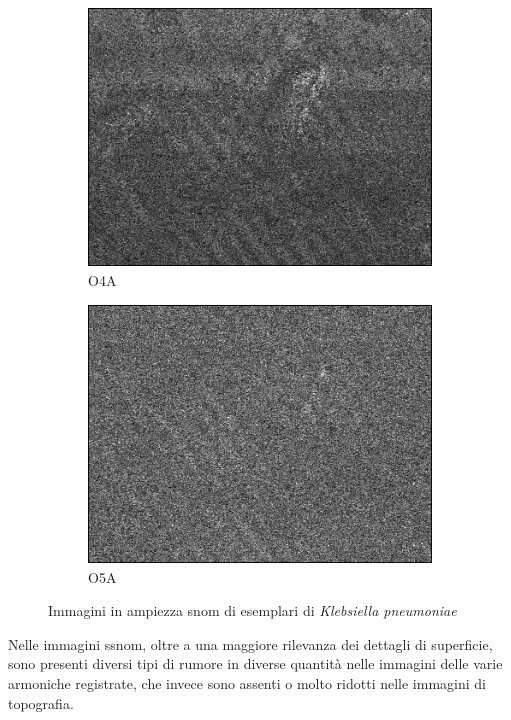 \documentclass[../main.tex]{subfiles}
\begin{document}
\begin{figure}[ht]
\begin{subfigure}{0.32\linewidth}
		\includegraphics[keepaspectratio, width=\linewidth]{images/kp_o4a.png}
		\caption{O4A}
	\end{subfigure}
	\begin{subfigure}{0.32\linewidth}
		\centering
		\includegraphics[keepaspectratio, width=\linewidth]{images/kp_o5a.png}
		\caption{O5A}
	\end{subfigure}
	\caption[Immagini in ampiezza SNOM di esemplari di \textit{Klebsiella pneumoniae}]{
		Immagini in ampiezza \acrshort{snom} di esemplari di \textit{Klebsiella pneumoniae} \cite{ssnombacter_data}}
\end{figure}

Nelle immagini \acrshort{ssnom}, oltre a una maggiore rilevanza dei dettagli di superficie, sono presenti diversi tipi di rumore in diverse quantità nelle immagini delle varie armoniche registrate, che invece sono assenti o molto ridotti nelle immagini di topografia.
\end{document}
